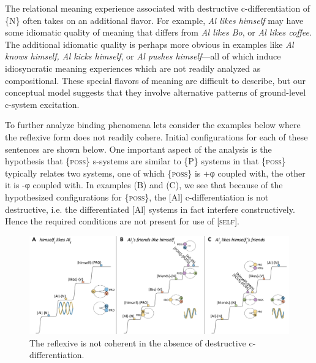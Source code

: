   The relational meaning experience associated with destructive c-differentiation of \{N\} often takes on an additional flavor. For example, \textit{Al likes himself} may have some idiomatic quality of meaning that differs from \textit{Al likes Bo}, or \textit{Al likes coffee}. The additional idiomatic quality is perhaps more obvious in examples like \textit{Al knows himself, Al kicks himself}, or \textit{Al pushes himself}—all of which induce idiosyncratic meaning experiences which are not readily analyzed as compositional. These special flavors of meaning are difficult to describe, but our conceptual model suggests that they involve alternative patterns of ground-level c-system excitation.

  To further analyze binding phenomena lets consider the examples below where the reflexive form does not readily cohere. Initial configurations for each of these sentences are shown below. One important aspect of the analysis is the hypothesis that \{\textsc{poss}\} s-systems are similar to \{P\} systems in that \{\textsc{poss}\} typically relates two systems, one of which \{\textsc{poss}\} is +φ coupled with, the other it is -φ coupled with. In examples (B) and (C), we see that because of the hypothesized configurations for \{\textsc{poss}\}, the [Al] c-differentiation is not destructive, i.e. the differentiated [Al] systems in fact interfere constructively. Hence the required conditions are not present for use of [\textsc{self}]. 

\ea
{}
\z
\z

\begin{figure}
\includegraphics[width=\textwidth]{figures/Tilsen-img157.png}
\caption{The reflexive is not coherent in the absence of destructive c-differentiation.}
\label{fig:7:13}
\end{figure}
 

